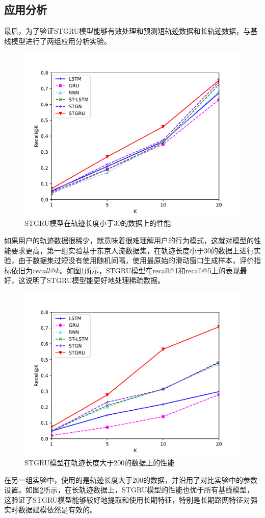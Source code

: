 \documentclass[master]{thesis-uestc}
\begin{document}
\subsection{应用分析}
最后，为了验证STGRU模型能够有效处理和预测短轨迹数据和长轨迹数据，与基线模型进行了两组应用分析实验。
\begin{figure}[!ht]
\centering
\includegraphics[scale=0.5]{./pic/f2.pdf}
\caption{STGRU模型在轨迹长度小于30的数据上的性能}
\label{Figure.3.4}
\end{figure}

如果用户的轨迹数据很稀少，就意味着很难理解用户的行为模式，这就对模型的性能要求更高，第一组实验基于东京人流数据集，在轨迹长度小于30的数据上进行实验，由于数据集过短没有使用随机间隔，使用最原始的滑动窗口生成样本，评价指标依旧为$recall@k$。如图\ref{Figure.3.4}所示，STGRU模型在recall@1和recall@5上的表现最好，这说明了STGRU模型能更好地处理稀疏数据。

\begin{figure}[!ht]
\centering
\includegraphics[scale=0.5]{./pic/f1.pdf}
\caption{STGRU模型在轨迹长度大于200的数据上的性能}
\label{Figure.3.5}
\end{figure}
在另一组实验中，使用的是轨迹长度大于200的数据，并沿用了对比实验中的参数设置。如图\ref{Figure.3.5}所示，在长轨迹数据上，STGRU模型的性能也优于所有基线模型，这验证了STGRU模型能够较好地提取和使用长期特征，特别是长期路网特征对强实时数据建模依然是有效的。
\end{document}

